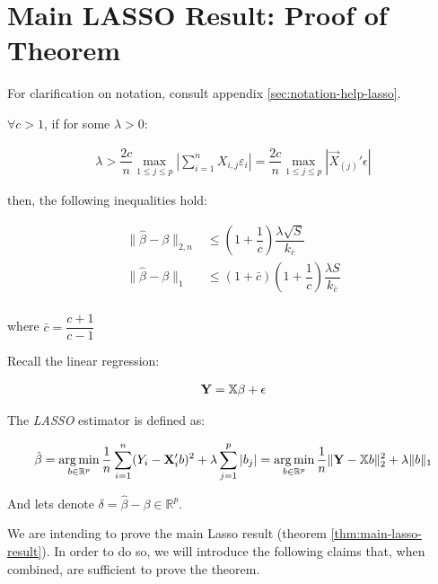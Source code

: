 \section{
    Main LASSO Result: Proof of Theorem 
}

For clarification on notation, consult appendix \ref{sec:notation-help-lasso}.

\begin{theorem}
\label{thm:main-lasso-result}
$\forall c > 1$, if for some $\lambda > 0$:

\begin{align*}
\lambda > \dfrac{2c}{n}
\max_{1 \leq j \leq p} \left|
    \sum_{i=1}^{n}X_{i,j} \varepsilon_i
\right|
= 
\dfrac{2c}{n}
\max_{1 \leq j \leq p} \left|
    \Vec{X}_{(j)}' \epsilon
\right|
\end{align*}

then, the following inequalities hold:

\begin{align*}
\|\hat{\beta} - \beta\|_{2, n}
&\leq 
\left(1 + \dfrac{1}{c}\right)
\dfrac{\lambda \sqrt{S}}{k_{\bar{c}}}\\
\|\hat{\beta} - \beta\|_{1}
&\leq 
\left(1 + \bar{c}\right) \left(1 + \dfrac{1}{c}\right)
\dfrac{\lambda S}{k_{\bar{c}}}\\
\end{align*}

where $\bar{c} = \dfrac{c+1}{c-1}$
\end{theorem}

Recall the linear regression:

\begin{align}
    \mathbf{Y} = \mathbb{X} \beta + \epsilon
    \label{eq:linear-regression}
\end{align}

The \emph{LASSO} estimator is defined as:

\begin{align}
\hat{\beta} 
=  \operatorname*{arg\,min}_{b \in \mathbb{R}^p} 
    \dfrac{1}{n} \sum_{i=1}^{n} (Y_i - \mathbf{X}_i' b)^2
    + \lambda \sum_{j=1}^{p} |b_j|
= \operatorname*{arg\,min}_{b \in \mathbb{R}^p} 
    \dfrac{1}{n} \|\mathbf{Y} - \mathbb{X} b\|_{2}^{2}
    + \lambda \|b\|_{1}
\label{eq:lasso-estimator}
\end{align}

And lets denote $\delta = \hat{\beta} - \beta \in \mathbb{R}^p$.

We are intending to prove the main Lasso result (theorem \ref{thm:main-lasso-result}). In order to do so, we will introduce the following claims that, when combined, are sufficient to prove the theorem.


